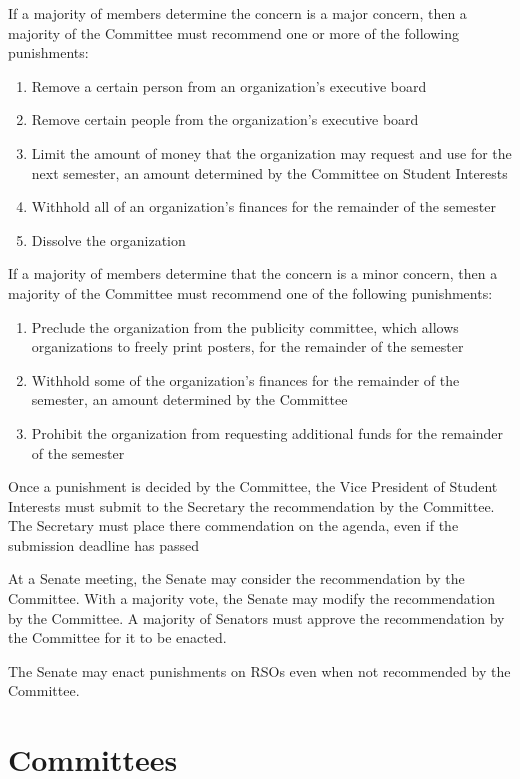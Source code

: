 \documentclass[12pt]{scrreprt}
\begin{document}
If a majority of members determine the concern is a major concern, then a majority of the Committee must recommend one or more of the following punishments:
\begin{enumerate}
    \item Remove a certain person from an organization's executive board
    \item Remove certain people from the organization’s executive board
    \item Limit the amount of money that the organization may request and use for the next semester, an amount determined by the Committee on Student Interests
    \item Withhold all of an organization’s finances for the remainder of the semester 
    \item Dissolve the organization
\end{enumerate}
If a majority of members determine that the concern is a minor concern, then a majority of the Committee must recommend one of the following punishments:
\begin{enumerate}
    \item Preclude the organization from the publicity committee, which allows organizations to freely print posters, for the remainder of the semester
    \item Withhold some of the organization’s finances for the remainder of the semester, an amount determined by the Committee
    \item Prohibit the organization from requesting additional funds for the remainder of the semester
\end{enumerate}

Once a punishment is decided by the Committee, the Vice President of Student Interests must submit to the Secretary the recommendation by the Committee. The Secretary must place there commendation on the agenda, even if the submission deadline has passed

At a Senate meeting, the Senate may consider the recommendation by the Committee. With a majority vote, the Senate may modify the recommendation by the Committee. A majority of Senators must approve the recommendation by the Committee for it to be enacted.

The Senate may enact punishments on RSOs even when not recommended by the Committee.
    

\chapter{Committees}
\end{document}
